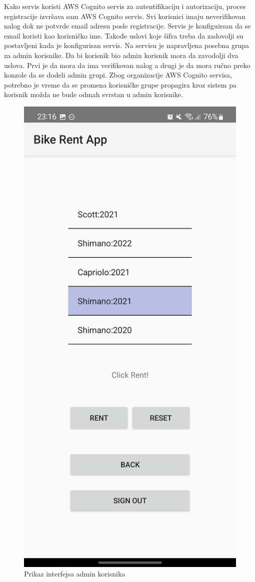 \documentclass[12pt,oneside]{memoir}
\begin{document}
Kako servis koristi AWS Cognito servis za autentifikaciju i autorizaciju, proces registracije izvršava sam AWS Cognito servis. Svi korisnici imaju neverifikovan nalog dok ne potvrde email adresu posle registracije. Servis je konfiguirsan da se email koristi kao korisničko ime. Takođe uslovi koje šifra treba da zadovolji su postavljeni kada je konfigurisan servis. Na servisu je napravljena posebna grupa za admin korisnike. Da bi korisnik bio admin korisnik mora da zavodolji dva uslova. Prvi je da mora da ima verifikovan nalog a drugi je da mora ručno preko konzole da se dodeli admin grupi. Zbog organizacije AWS Cognito servisa, potrebno je vreme da se promena korisničke grupe propagira kroz sistem pa korisnik možda ne bude odmah svrstan u admin korisnike.
 

\begin{figure}[!ht]
  \centering
  \includegraphics[height=0.6\textwidth]{AdminKorisnikInterfejs.jpg}
  \caption{Prikaz interfejsa admin korisnika}
  \label{fig:adminKorisnikInterfejs}
\end{figure}
\end{document}
